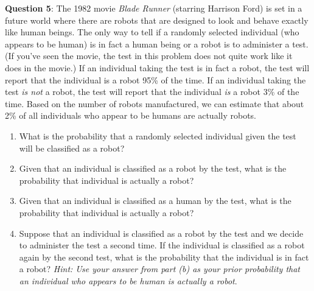 \documentclass[10pt]{amsart}
\begin{document}
\noindent \textbf{Question 5}: The 1982 movie \textit{Blade Runner} (starring Harrison Ford) is set in a future world where there are robots that are designed to look and behave exactly like human beings. The only way to tell if a randomly selected individual (who appears to be human) is in fact a human being or a robot is to administer a test. (If you've seen the movie, the test in this problem does not quite work like it does in the movie.) If an individual taking the test is in fact a robot, the test will report that the individual is a robot 95\% of the time. If an individual taking the test \textit{is not} a robot, the test will report that the individual \textit{is} a robot 3\% of the time.  Based on the number of robots manufactured, we can estimate that about 2\% of all individuals who appear to be humans are actually robots.
\begin{enumerate}
\medskip
\item What is the probability that a randomly selected individual given the test will be classified as a robot?
\medskip
\item Given that an individual is classified as a robot by the test, what is the probability that individual is actually a robot?
\medskip
\item Given that an individual is classified as a human by the test, what is the probability that individual is actually a robot?
\medskip
\item Suppose that an individual is classified as a robot by the test and we decide to administer the test a second time. If the individual is classified as a robot again by the second test, what is the probability that the individual is in fact a robot? \textit{Hint: Use your answer from part (b) as your prior probability that an individual who appears to be human is actually a robot}.
\end{enumerate}

\bigskip
\end{document}
